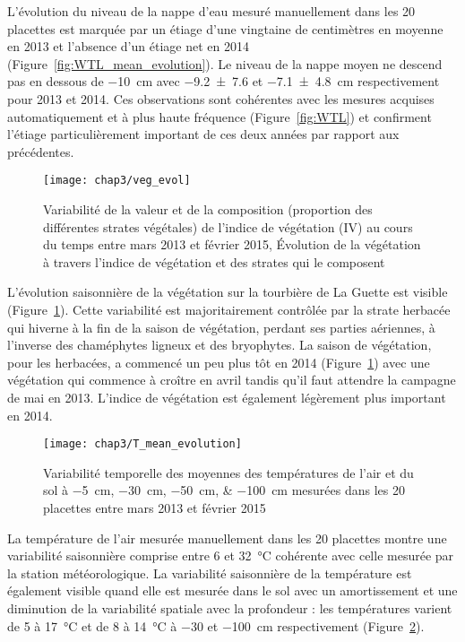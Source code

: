 L'évolution du niveau de la nappe d'eau mesuré manuellement dans les 20 placettes est marquée par un étiage d'une vingtaine de centimètres en moyenne en 2013 et l'absence d'un étiage net en 2014 (Figure~\ref{fig:WTL_mean_evolution}).
Le niveau de la nappe moyen ne descend pas en dessous de \SI{-10}{\cm} avec \num{-9.2(76)} et \SI{-7.1(48)}{\centi\metre} respectivement pour 2013 et 2014.
Ces observations sont cohérentes avec les mesures acquises automatiquement et à plus haute fréquence (Figure~\ref{fig:WTL}) et confirment l'étiage particulièrement important de ces deux années par rapport aux précédentes.

\begin{figure}
\centering
\texttt{[image: chap3/veg\_evol]}
\caption{Variabilité de la valeur et de la composition (proportion des différentes strates végétales) de l'indice de végétation (IV) au cours du temps entre mars 2013 et février 2015, 
Évolution de la végétation à travers l'indice de végétation et des strates qui le composent}
\label{fig:veg_evol}
\end{figure}

L'évolution saisonnière de la végétation sur la tourbière de La Guette est visible (Figure~\ref{fig:veg_evol}).
Cette variabilité est majoritairement contrôlée par la strate herbacée qui hiverne à la fin de la saison de végétation, perdant ses parties aériennes, à l'inverse des chaméphytes ligneux et des bryophytes.
La saison de végétation, pour les herbacées, a commencé un peu plus tôt en 2014 (Figure~\ref{fig:veg_evol}) avec une végétation qui commence à croître en avril tandis qu'il faut attendre la campagne de mai en 2013.
L'indice de végétation est également légèrement plus important en 2014.

\begin{figure}
\centering
\texttt{[image: chap3/T\_mean\_evolution]}
\caption{Variabilité temporelle des moyennes des températures de l'air et du sol à \SIlist{-5;-30;-50;-100}{\centi\metre} mesurées dans les 20 placettes entre mars 2013 et février 2015}
\label{fig:T_mean_evolution}
\end{figure}

La température de l'air mesurée manuellement dans les 20 placettes montre une variabilité saisonnière comprise entre 6 et \SI{32}{\degreeCelsius} cohérente avec celle mesurée par la station météorologique. 
La variabilité saisonnière de la température est également visible quand elle est mesurée dans le sol avec un amortissement et une diminution de la variabilité spatiale avec la profondeur : les températures varient de 5 à \SI{17}{\degreeCelsius} et de 8 à \SI{14}{\degreeCelsius} à \num{-30} et \SI{-100}{\centi\metre} respectivement (Figure~\ref{fig:T_mean_evolution}).

